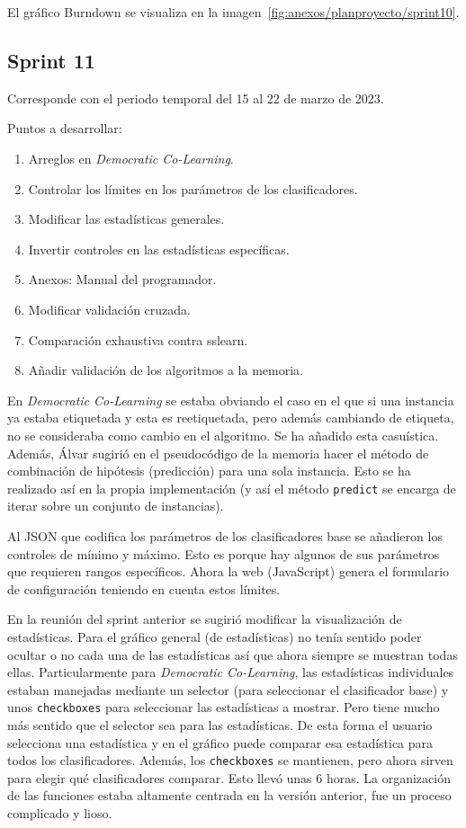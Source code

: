 El gráfico Burndown se visualiza en la imagen~\ref{fig:anexos/planproyecto/sprint10}.

\subsection{Sprint 11}
Corresponde con el periodo temporal del 15 al 22 de marzo de 2023.

Puntos a desarrollar:
\begin{enumerate}
    \item Arreglos en \textit{Democratic Co-Learning}.
    \item Controlar los límites en los parámetros de los clasificadores.
    \item Modificar las estadísticas generales.
    \item Invertir controles en las estadísticas específicas.
    \item Anexos: Manual del programador.
    \item Modificar validación cruzada.
    \item Comparación exhaustiva contra sslearn.
    \item Añadir validación de los algoritmos a la memoria.
\end{enumerate}

En \textit{Democratic Co-Learning} se estaba obviando el caso en el que si una
instancia ya estaba etiquetada y esta es reetiquetada, pero además cambiando de
etiqueta, no se consideraba como cambio en el algoritmo. Se ha añadido esta
casuística. Además, Álvar sugirió en el pseudocódigo de la memoria hacer el
método de combinación de hipótesis (predicción) para una sola instancia. Esto se
ha realizado así en la propia implementación (y así el método \texttt{predict}
se encarga de iterar sobre un conjunto de instancias).

Al JSON que codifica los parámetros de los clasificadores base se añadieron los
controles de mínimo y máximo. Esto es porque hay algunos de sus parámetros que
requieren rangos específicos. Ahora la web (JavaScript) genera el formulario de
configuración teniendo en cuenta estos límites.

En la reunión del sprint anterior se sugirió modificar la visualización de
estadísticas. Para el gráfico general (de estadísticas) no tenía sentido poder
ocultar o no cada una de las estadísticas así que ahora siempre se muestran
todas ellas. Particularmente para \textit{Democratic Co-Learning}, las
estadísticas individuales estaban manejadas mediante un selector (para
seleccionar el clasificador base) y unos \texttt{checkboxes} para seleccionar
las estadísticas a mostrar. Pero tiene mucho más sentido que el selector sea
para las estadísticas. De esta forma el usuario selecciona una estadística y en
el gráfico puede comparar esa estadística para todos los clasificadores. Además,
los \texttt{checkboxes} se mantienen, pero ahora sirven para elegir qué
clasificadores comparar. Esto llevó unas 6 horas. La organización de las
funciones estaba altamente centrada en la versión anterior, fue un proceso
complicado y lioso.

